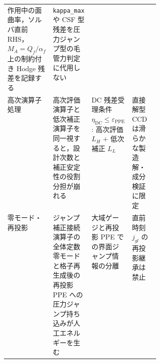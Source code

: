 \begin{table}[htbp]
\begin{tabularx}{\linewidth}{@{}>{\raggedright\arraybackslash}p{0.18\linewidth}>{\raggedright\arraybackslash}X>{\raggedright\arraybackslash}X>{\raggedright\arraybackslash}p{0.18\linewidth}@{}}
作用中の面曲率，ソルバ直前 RHS，$M_A=Q_f/\alpha_f$ 上の制約付き Hodge 残差を記録する &
\texttt{kappa\_max} や CSF 型残差を圧力ジャンプ型の毛管力判定に代用しない \\
高次演算子処理 & 高次評価演算子と低次補正演算子を同一視すると，設計次数と補正安定性の役割分担が崩れる &
DC 残差受理条件 $\eta_{\mathrm{DC}}\le\varepsilon_{\mathrm{PPE}}$: 高次評価 $L_H$ + 低次補正 $L_L$ &
直接解型 CCD は滑らかな製造解・成分検証に限定 \\
零モード・再投影 & ジャンプ補正接続演算子の全体定数零モードと格子再生成後の再投影 PPE への圧力ジャンプ持ち込みが人工エネルギーを生む &
大域ゲージと再投影 PPE での界面ジャンプ情報の分離 &
直前時刻 $j_{gl}$ の再投影継承は禁止 \\
\bottomrule
\end{tabularx}
\end{table}

